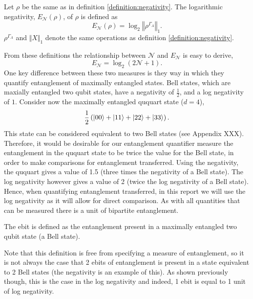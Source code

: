 \begin{definition}
    \label{definition:log_neg}
    Let $\rho$ be the same as in definition \ref{definition:negativity}.
    The logarithmic negativity, $E_\mathcal{N}(\rho)$, of $\rho$ is defined as
    \begin{equation}
        E_\mathcal{N}(\rho) = \log_2\left\Vert \rho^{\Gamma_A}\right\Vert_1.
    \end{equation}
    $\rho^{\Gamma_A}$ and $\Vert X \Vert_1$ denote the same operations as definition \ref{definition:negativity}.
\end{definition}
From these definitions the relationship between $\mathcal{N}$ and $E_{\mathcal{N}}$ is easy to derive,
\begin{equation}
    E_\mathcal{N} = \log_2\left(2\mathcal{N} + 1\right).
\end{equation}
One key difference between these two measures is they way in which they quantify entanglement of maximally entangled states.
Bell states, which are maxially entangled two qubit states, have a negativity of $\frac{1}{2}$, and a log negativity of $1$.
Consider now the maximally entangled ququart state ($d = 4$),
\begin{equation}
    \frac{1}{2}\left(\ket{00} + \ket{11} + \ket{22} + \ket{33}\right).
\end{equation}
This state can be considered equivalent to two Bell states (see Appendix XXX).
Therefore, it would be desirable for our entanglement quantifier measure the entanglement in the ququart state to be twice the value for the Bell state, in order to make comparisons for entanglement transferred.
Using the negativity, the ququart gives a value of 1.5 (three times the negativity of a Bell state).
The log negativity however gives a value of 2 (twice the log negativity of a Bell state).
Hence, when quantifying entanglement transferred, in this report we will use the log negativity as it will allow for direct comparison.
As with all quantities that can be measured there is a unit of bipartite entanglement.
\begin{definition}[Ebit]
    \label{definition:ebit}
    The ebit is defined as the entanglement present in a maximally entangled two qubit state (a Bell state).
\end{definition}
Note that this definition is free from specifying a measure of entanglement, so it is not always the case that 2 ebits of entanglement is present in a state equivalent to 2 Bell states (the negativity is an example of this).
As shown previously though, this is the case in the log negativity and indeed, 1 ebit is equal to 1 unit of log negativity.

